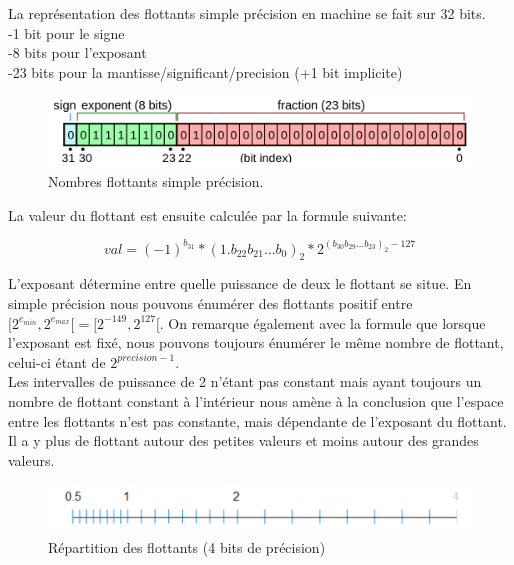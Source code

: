 \documentclass[12pt]{article}
\begin{document}
La représentation des flottants simple précision en machine se fait sur 32 bits.\\
-1 bit pour le signe \\
-8 bits pour l'exposant \\
-23 bits pour la mantisse/significant/precision (+1 bit implicite) \\

\begin{figure}[!h]
    \begin{center}
      \includegraphics[scale=0.35]{32-float.png}
      \caption{Nombres flottants simple précision.}
      \label{Représentation en machine des nombres flottants simple précision.}
    \end{center}

\end{figure}

La valeur du flottant est ensuite calculée par la formule suivante:
\begin{center}
\begin{equation}
       val =  (-1)^{b_{31}} * (1.b_{22}b_{21}...b_0)_2 * 2^{(b_{30}b_{29}...b_{23})_2 - 127}
\end{equation}
\end{center}

L'exposant détermine entre quelle puissance de deux le flottant se situe. En simple précision nous pouvons
énumérer des flottants positif entre $[2^{e_{min}}, 2^{e_{max}}[ =  [2^{-149}, 2^{127}[$. On remarque également
avec la formule que lorsque l'exposant est fixé, nous pouvons toujours énumérer le même nombre de flottant, celui-ci
étant de $2^{precision - 1}$. \\
Les intervalles de puissance de 2 n'étant pas constant mais ayant toujours un
nombre de flottant constant à l'intérieur nous amène à la conclusion que l'espace entre les flottants n'est pas
constante, mais dépendante de l'exposant du flottant. \\
Il a y plus de flottant autour des petites valeurs et moins autour des grandes valeurs.\\

\begin{figure}[!h]
    \begin{center}
      \includegraphics[scale=0.35]{repartition-float.png}
      \caption{Répartition des flottants (4 bits de précision)}
      \label{Exemple de répartition de flottants avec 4 bits de précision}
    \end{center}
\end{figure}
\end{document}
